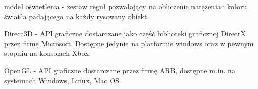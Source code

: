 \documentclass[11pt,leqno]{article}
\begin{document}
model oświetlenia - zestaw reguł pozwalający na obliczenie natężenia i koloru światła padającego na każdy rysowany obiekt.

Direct3D - API graficzne dostarczane jako część biblioteki graficznej DirectX przez firmę Microsoft. Dostępne jedynie na platformie windows oraz w pewnym stopniu na konsolach Xbox.

OpenGL - API graficzne dostarczane przez firmę ARB, dostępne m.in. na systemach Windows, Linux, Mac OS.
\end{document}
